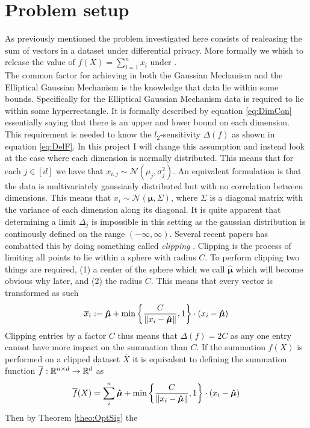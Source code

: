 \documentclass[a4paper,12pt]{article}
\begin{document}
\section{Problem setup}
\label{seq:problem}
As previously mentioned the problem investigated here consists of realeasing the sum of vectors 
in a dataset under differential privacy.
More formally we whish to release the value of 
$ f(X) = \sum_{i = 1}^n x_i  $
under \edp. \\
The common factor for achieving \edp in both the Gaussian Mechanism
and the Elliptical Gaussian Mechanism is the knowledge that data lie within some bounds.
Specifically for the Elliptical Gaussian Mechanism data is required to lie within some hyperrectangle.
It is formally described by equation \eqref{eq:DimCon} 
essentially saying that there is an upper and lower bound on each dimension.
This requirement is needed to know the $l_2$-sensitivity $ \Delta(f) $ as shown in equation \eqref{eq:DelF}.
In this project I will change this assumption and instead 
look at the case where each dimension is normally distributed.
This means that for each 
$ j \in [d] $ we have that 
$x_{i,j} \sim \mathcal{N}(\mu_j, \sigma_j^2)$.
An equivalent formulation is that the data is 
multivariately gaussianly distributed but with no correlation between dimensions.
This means that $x_i \sim \mathcal{N}(\bm{\mu}, \Sigma ) $, 
where $\Sigma$ is a diagonal matrix with the variance of each 
dimension along its diagonal.
It is quite apparent that determining a limit $ \Delta_j $ is impossible 
in this setting as the gaussian distribution is continously defined 
on the range $ (-\infty, \infty)$.
Several recent papers has combatted this by doing something called 
\textit{clipping} \cite{Huang2021,coinpress}. 
Clipping is the process of limiting all points to lie within a sphere with radius $C$.
To perform clipping two things are required, (1) a center of the sphere which we call $\bm{\hat{\mu}}$
which will become obvious why later, and (2) the radius $C$.
This means that every vector is transformed as such
\[
    \overline{x}_i := \bm{\hat{\mu}} + \min \left \{\frac{C}{\| x_i - \bm{\hat{\mu}} \|}, 1\right\} \cdot (x_i - \bm{\hat{\mu}})
\]
Clipping entries by a factor $C$ thus means that $ \Delta(f) = 2C $ 
as any one entry cannot have more impact on the summation than $C$.
If the summation $f(X)$ is 
performed on a clipped dataset $\overline{X}$ it is equivalent to
defining the summation function $\overline{f}: \mathbb{R}^{n \times d} \rightarrow \mathbb{R}^d$ as
\[
    \overline{f}(X) = \sum_i^n \bm{\hat{\mu}} + \min \left \{ \frac{C}{\| x_i - \bm{\hat{\mu}} \|}, 1\right\} \cdot (x_i - \bm{\hat{\mu}})
\]
Then by Theorem \ref{theo:OptSig} the 
\end{document}
